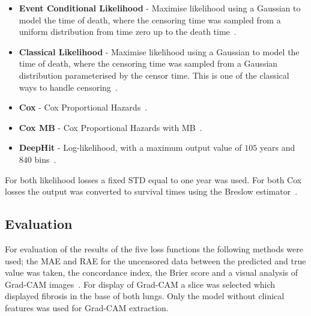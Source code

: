             \begin{itemize}
                \item \textbf{Event Conditional Likelihood} - Maximise likelihood using a Gaussian to model the time of death, where the censoring time was sampled from a uniform distribution from time zero up to the death time~\parencite{Shahin2023DeepAnalysis}.
    
                \item \textbf{Classical Likelihood} - Maximise likelihood using a Gaussian to model the time of death, where the censoring time was sampled from a Gaussian distribution parameterised by the censor time. This is one of the classical ways to handle censoring~\parencite{Lee2018DeepHit:Risks}.
    
                \item \textbf{Cox} - Cox Proportional Hazards~\parencite{Cox1972RegressionLife-Tables}.
    
                \item \textbf{Cox \gls{MB}} - Cox Proportional Hazards with \gls{MB}~\parencite{Shahin2022SurvivalData}.
    
                \item \textbf{DeepHit} - Log-likelihood, with a maximum output value of $105$ years and $840$ bins~\parencite{Lee2018DeepHit:Risks}.
            \end{itemize}
    
            For both likelihood losses a fixed \gls{STD} equal to one year was used. For both Cox losses the output was converted to survival times using the Breslow estimator~\parencite{Breslow1974CovarianceData}.

        \subsection{Evaluation} \label{sec:deep_learning_for_ct_based_survival_analysis_of_idiopathic_pulmonary_fibrosis_patients_appendix_methods_evaluation}
            For evaluation of the results of the five loss functions the following methods were used; the \gls{MAE} and \gls{RAE} for the uncensored data between the predicted and true value was taken, the concordance index, the Brier score and a visual analysis of Grad-CAM images~\parencite{Raykar2008OnIndex, Gerds2006ConsistentTimes, Selvaraju2020Grad-CAM:Localization}. For display of Grad-CAM a slice was selected which displayed fibrosis in the base of both lungs. Only the model without clinical features was used for Grad-CAM extraction.
    
